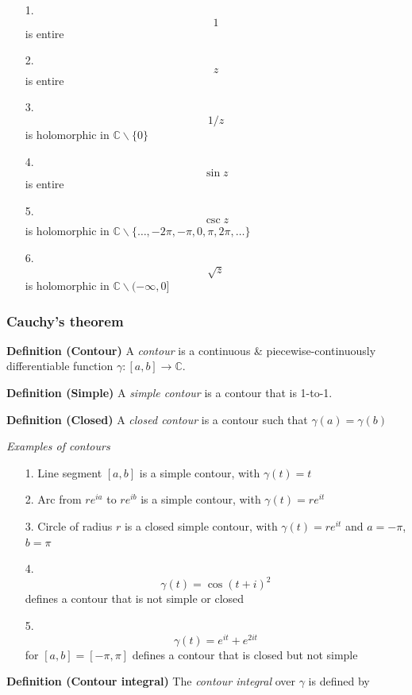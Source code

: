 \documentclass[12pt,a4paper]{article}
\begin{document}
\begin{itemize}
\item[1. ] \[
1
\]
is entire


\item[2. ] \[
z
\]
is entire


\item[3. ] \[
1/z
\]
is holomorphic in ${\mathbb C} \backslash \{0\}$


\item[4. ] \[
\sin z
\]
is entire


\item[5. ] \[
\csc z
\]
is holomorphic in ${\mathbb C} \backslash \{\ldots,-2\pi,-\pi,0,\pi,2\pi,\ldots\}$


\item[6. ] \[
\sqrt z
\]
is holomorphic in ${\mathbb C} \backslash (-\infty,0]$

\end{itemize}
\subsubsection{Cauchy's theorem}
\textbf{Definition (Contour)} A \emph{contour}  is a continuous \& piecewise-continuously differentiable function $\gamma : [a,b] \rightarrow {\mathbb C}$.

\textbf{Definition (Simple)} A \emph{simple contour} is a contour that is 1-to-1.

\textbf{Definition (Closed)} A \emph{closed contour} is a contour such that $\gamma(a) = \gamma(b)$

\emph{Examples of contours}

\begin{itemize}
\item[1. ] Line segment $[a,b]$ is a simple contour, with $\gamma(t) =  t$


\item[2. ] Arc from $re^{ia}$ to $re^{ib}$ is a simple contour, with $\gamma(t) =  re^{i t}$


\item[3. ] Circle of radius $r$ is a closed simple contour, with $\gamma(t) = re^{i t}$ and $a = -\pi$, $b = \pi$


\item[4. ] \[
\gamma(t) = \cos (t+i)^2
\]
defines a contour that is not simple or closed


\item[5. ] \[
\gamma(t) = e^{i t} + e^{2i t}
\]
for $[a,b] = [-\pi,\pi]$ defines a contour that is closed but not simple

\end{itemize}
\textbf{Definition (Contour integral)} The \emph{contour integral} over $\gamma$ is defined by
\end{document}
